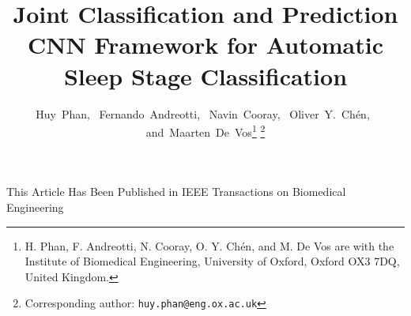\documentclass[10pt,twocolumn,twoside]{IEEEtran}
\begin{document}
\title{Joint Classification and Prediction CNN Framework for Automatic Sleep Stage Classification}



\author{Huy~Phan,~
				Fernando~Andreotti,~
				Navin~Cooray,~
				Oliver~Y.~Ch\'{e}n,~
        and~Maarten~De~Vos\thanks{H. Phan, F. Andreotti, N. Cooray, O. Y. Ch\'{e}n, and M. De Vos are with the Institute of Biomedical Engineering, University of Oxford, Oxford OX3 7DQ, United Kingdom.}
\thanks{Corresponding author: {\tt\footnotesize huy.phan@eng.ox.ac.uk}}}





{This Article Has Been Published in IEEE Transactions on Biomedical Engineering}











\maketitle
\end{document}
